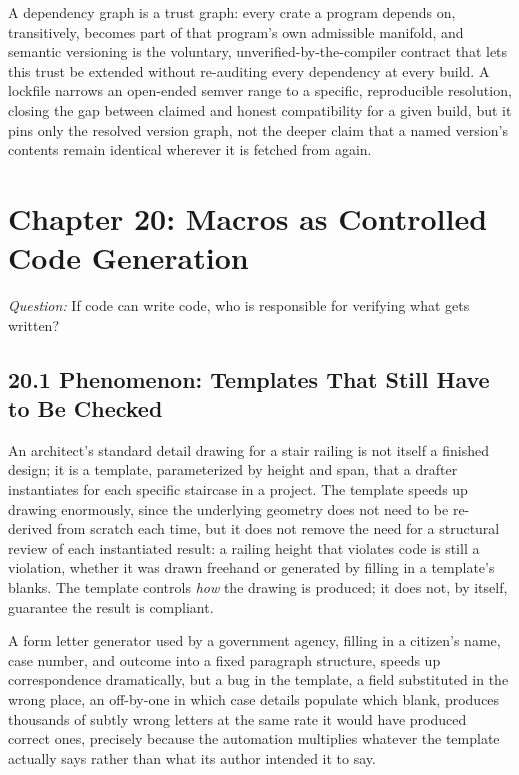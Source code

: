 \documentclass[11pt]{book}
\begin{document}
\begin{invariantbox}
A dependency graph is a trust graph: every crate a program depends on, transitively, becomes part of that program's own admissible manifold, and semantic versioning is the voluntary, unverified-by-the-compiler contract that lets this trust be extended without re-auditing every dependency at every build. A lockfile narrows an open-ended semver range to a specific, reproducible resolution, closing the gap between claimed and honest compatibility for a given build, but it pins only the resolved version graph, not the deeper claim that a named version's contents remain identical wherever it is fetched from again.
\end{invariantbox}

\clearpage

\chapter*{Chapter 20: Macros as Controlled Code Generation}

\begin{firstprinciples}
\textit{Question:} If code can write code, who is responsible for verifying what gets written?
\end{firstprinciples}

\section*{20.1 Phenomenon: Templates That Still Have to Be Checked}

An architect's standard detail drawing for a stair railing is not itself a finished design; it is a template, parameterized by height and span, that a drafter instantiates for each specific staircase in a project. The template speeds up drawing enormously, since the underlying geometry does not need to be re-derived from scratch each time, but it does not remove the need for a structural review of each instantiated result: a railing height that violates code is still a violation, whether it was drawn freehand or generated by filling in a template's blanks. The template controls \emph{how} the drawing is produced; it does not, by itself, guarantee the result is compliant.

A form letter generator used by a government agency, filling in a citizen's name, case number, and outcome into a fixed paragraph structure, speeds up correspondence dramatically, but a bug in the template, a field substituted in the wrong place, an off-by-one in which case details populate which blank, produces thousands of subtly wrong letters at the same rate it would have produced correct ones, precisely because the automation multiplies whatever the template actually says rather than what its author intended it to say.
\end{document}
